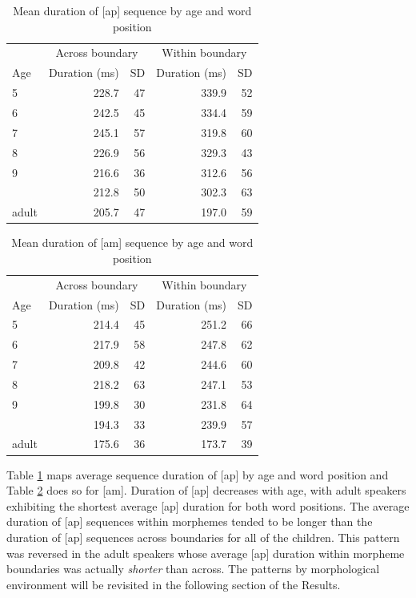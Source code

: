 \documentclass[
]{article}
\begin{document}
\begin{table}

\caption{\label{tab:ap-dur-tbl}Mean duration of [ap] sequence by age and word position}
\centering
\begin{tabular}[t]{lrrrr}
\toprule
\multicolumn{1}{c}{ } & \multicolumn{2}{c}{Across boundary} & \multicolumn{2}{c}{Within boundary} \\
\cmidrule(l{3pt}r{3pt}){2-3} \cmidrule(l{3pt}r{3pt}){4-5}
Age & Duration (ms) & SD  & Duration (ms) & SD\\
\midrule
5 & 228.7 & 47 & 339.9 & 52\\
6 & 242.5 & 45 & 334.4 & 59\\
7 & 245.1 & 57 & 319.8 & 60\\
8 & 226.9 & 56 & 329.3 & 43\\
9 & 216.6 & 36 & 312.6 & 56\\
\addlinespace
10 & 212.8 & 50 & 302.3 & 63\\
adult & 205.7 & 47 & 197.0 & 59\\
\bottomrule
\end{tabular}
\end{table}

\begin{table}

\caption{\label{tab:am-dur-tbl}Mean duration of [am] sequence by age and word position}
\centering
\begin{tabular}[t]{lrrrr}
\toprule
\multicolumn{1}{c}{ } & \multicolumn{2}{c}{Across boundary} & \multicolumn{2}{c}{Within boundary} \\
\cmidrule(l{3pt}r{3pt}){2-3} \cmidrule(l{3pt}r{3pt}){4-5}
Age & Duration (ms) & SD  & Duration (ms) & SD\\
\midrule
5 & 214.4 & 45 & 251.2 & 66\\
6 & 217.9 & 58 & 247.8 & 62\\
7 & 209.8 & 42 & 244.6 & 60\\
8 & 218.2 & 63 & 247.1 & 53\\
9 & 199.8 & 30 & 231.8 & 64\\
\addlinespace
10 & 194.3 & 33 & 239.9 & 57\\
adult & 175.6 & 36 & 173.7 & 39\\
\bottomrule
\end{tabular}
\end{table}

Table \ref{tab:ap-dur-tbl} maps average sequence duration of {[}ap{]} by age and word position and Table \ref{tab:am-dur-tbl} does so for {[}am{]}. Duration of {[}ap{]} decreases with age, with adult speakers exhibiting the shortest average {[}ap{]} duration for both word positions. The average duration of {[}ap{]} sequences within morphemes tended to be longer than the duration of {[}ap{]} sequences across boundaries for all of the children. This pattern was reversed in the adult speakers whose average {[}ap{]} duration within morpheme boundaries was actually \emph{shorter} than across. The patterns by morphological environment will be revisited in the following section of the Results.
\end{document}
